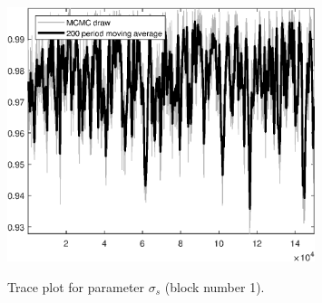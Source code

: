 \begin{figure}[H]
\centering
  \includegraphics[width=0.8\textwidth]{BRS_gen/graphs/TracePlot_sigma_s_blck_1}\\
    \caption{Trace plot for parameter $\sigma_s$ (block number 1).}
\end{figure}

